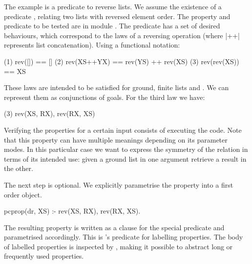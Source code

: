The example is a predicate to reverse lists.
%
We assume the existence of a predicate , relating two lists
with reversed element order.
%
The property and predicate to be tested are in %
module%
 .%
%
The  predicate has a set of desired behaviours, which
correspond to the laws of a reversing operation (where |++| 
represents list concatenation).%
%
Using a functional notation:
{
\begin{code}
(1)        rev([])     == []
(2)     rev(XS++YX)    == rev(YS) ++ rev(XS)
(3)      rev(rev(XS))  == XS
\end{code}
}
These laws are intended to be satisfied for ground, finite lists
 and .
%
We can represent
 them as conjunctions of \Prolog{} goals. %
For the third law we have:
%
\begin{yapcode}
  (3)  rev(XS, RX), rev(RX, XS)
\end{yapcode}
%
Verifying the properties for a certain input consists of
executing the code. %
%
Note that this property can have multiple meanings
depending on its parameter modes.
%
In this particular case we want to express the symmetry of the
 relation in terms of its intended use: given a ground
list in one argument retrieve a result in the other.


The next step is optional.
%
We explicitly parametrise the property into a first order object.
%
\begin{yapcode}
 pcprop({dr, XS}) :- rev(XS, RX), rev(RX, XS).
\end{yapcode}
%
The resulting property
is  written as a clause for the special
predicate  and parametrised accordingly.
%
This is \plqc{}'s predicate for labelling properties.
%
The body of labelled properties is inspected by \plqc{},
making it possible to abstract long or
frequently used properties.%


